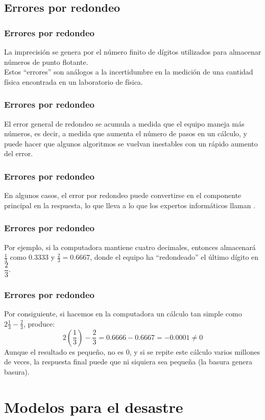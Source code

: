 \documentclass[12pt]{beamer}
\begin{document}
\subsection{Errores por redondeo}

\begin{frame}
\frametitle{Errores por redondeo}
La imprecisión se genera por el número finito de dígitos utilizados para almacenar números de punto flotante.
\\
\bigskip
\pause
Estos \enquote{errores} son análogos a la incertidumbre en la medición de una cantidad física encontrada en un laboratorio de física.
\end{frame}
\begin{frame}
\frametitle{Errores por redondeo}
El error general de redondeo se acumula a medida que el equipo maneja más números, es decir, a medida que aumenta el número de pasos en un cálculo, y puede hacer que algunos algoritmos se vuelvan inestables con un rápido aumento del error.
\end{frame}
\begin{frame}
\frametitle{Errores por redondeo}
En algunos casos, el error por redondeo puede convertirse en el componente principal en la respuesta, lo que lleva a lo que los expertos informáticos llaman .
\end{frame}
\begin{frame}
\frametitle{Errores por redondeo}
Por ejemplo, si la computadora mantiene cuatro decimales, entonces almacenará $\frac{1}{3}$ como $0.3333$ y $\frac{2}{3} = 0.6667$, donde el equipo ha \enquote{redondeado} el último dígito en $\dfrac{2}{3}$.
\end{frame}
\begin{frame}
\frametitle{Errores por redondeo}
Por consiguiente, si hacemos en la computadora un cálculo tan simple como $2 \frac{1}{3} - \frac{2}{3}$, produce:
\pause
\begin{equation}
2 \left( \dfrac{1}{3} \right) - \dfrac{2}{3} = 0.6666 - 0.6667 = -0.0001 \neq 0
\label{eq:ecuacion_02_03}
\end{equation}
\pause
Aunque el resultado es pequeño, no es $0$, y si se repite este cálculo varios millones de veces, \pause la respuesta final puede que ni siquiera sea pequeña (\textcolor{lava}{la basura genera basura}).
\end{frame}

\section{Modelos para el desastre}
\end{document}
